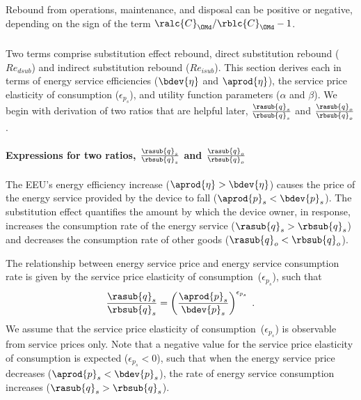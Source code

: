 Rebound from operations, maintenance, and disposal can be positive or negative,
depending on the sign of the term $\ralc{C}_{\OMd}/\rblc{C}_{\OMd} - 1$.


\subsubsection{\Subeffect{}} 
\label{sec:Re_sub}

Two terms comprise substitution effect rebound, 
direct substitution rebound ($Re_{dsub}$) and 
indirect substitution rebound ($Re_{isub}$).
This section derives each in terms of energy service efficiencies ($\bdev{\eta}$ and $\aprod{\eta}$),
the service price elasticity of consumption ($\epsilon_{p_s}$), and 
utility function parameters ($\alpha$ and $\beta$).
We begin with derivation of two ratios that are helpful later, 
$\frac{\rasub{q}_s}{\rbsub{q}_s}$ and 
$\frac{\rasub{q}_o}{\rbsub{q}_o}$.


\paragraph{Expressions for two ratios, $\frac{\rasub{q}_s}{\rbsub{q}_s}$ and $\frac{\rasub{q}_o}{\rbsub{q}_o}$} 
\label{sec:two_ratios}

The EEU's energy efficiency increase
($\aprod{\eta} > \bdev{\eta}$) 
causes the price of the energy service provided by the device to fall
($\aprod{p}_s < \bdev{p}_s$). 
The substitution effect quantifies the amount by which 
the device owner, in response, 
increases the consumption rate of the energy service ($\rasub{q}_s > \rbsub{q}_s$) and 
decreases the consumption rate of other goods ($\rasub{q}_o < \rbsub{q}_o$).

The relationship between energy service price and energy service consumption rate
is given by the service price elasticity of consumption~($\epsilon_{p_s}$), 
such that
%
\begin{equation}
  \frac{\rasub{q}_s}{\rbsub{q}_s} = \left( \frac{\aprod{p}_s}{\bdev{p}_s} \right)^{\epsilon_{p_s}} \; .
\end{equation}
%
We assume that the service price elasticity of consumption~($\epsilon_{p_s}$) is observable 
from service prices only. 
Note that a negative value for the service price elasticity of consumption is expected ($\epsilon_{p_s} < 0$),
such that when the energy service price decreases ($\aprod{p}_s < \bdev{p}_s$), 
the rate of energy service consumption increases ($\rasub{q}_s > \rbsub{q}_s$).

